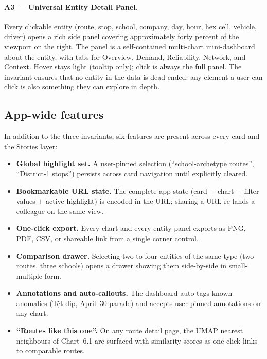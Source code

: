 \paragraph{A3 --- Universal Entity Detail Panel.}
Every clickable entity (route, stop, school, company, day, hour,
hex cell, vehicle, driver) opens a rich side panel covering
approximately forty percent of the viewport on the right. The
panel is a self-contained multi-chart mini-dashboard about the
entity, with tabs for Overview, Demand, Reliability, Network,
and Context. Hover stays light (tooltip only); click is always
the full panel. The invariant ensures that no entity in the
data is dead-ended: any element a user can click is also
something they can explore in depth.

\subsection{App-wide features}
\label{sec:proposed:appwide}

In addition to the three invariants, six features are present
across every card and the Stories layer:

\begin{itemize}
\item \textbf{Global highlight set.} A user-pinned selection
    (``school-archetype routes'', ``District-1 stops'') persists
    across card navigation until explicitly cleared.
\item \textbf{Bookmarkable URL state.} The complete app state
    (card $+$ chart $+$ filter values $+$ active highlight) is
    encoded in the URL; sharing a URL re-lands a colleague on
    the same view.
\item \textbf{One-click export.} Every chart and every entity
    panel exports as PNG, PDF, CSV, or shareable link from a
    single corner control.
\item \textbf{Comparison drawer.} Selecting two to four entities
    of the same type (two routes, three schools) opens a drawer
    showing them side-by-side in small-multiple form.
\item \textbf{Annotations and auto-callouts.} The dashboard
    auto-tags known anomalies (T\d ết dip, April~30 parade) and
    accepts user-pinned annotations on any chart.
\item \textbf{``Routes like this one''.} On any route detail
    page, the UMAP nearest neighbours of Chart~6.1 are surfaced
    with similarity scores as one-click links to comparable
    routes.
\end{itemize}

